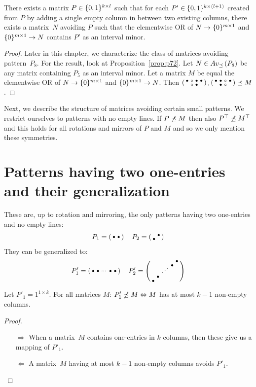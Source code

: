 \begin{prop}
There exists a matrix $P\in\{0,1\}^{k\times l}$ such that for each $P'\in\{0,1\}^{k\times(l+1)}$ created from $P$ by adding a single empty column in between two existing columns, there exists a matrix~$N$ avoiding $P$ such that the elementwise OR of $N\rightarrow\{0\}^{m\times 1}$ and $\{0\}^{m\times 1}\rightarrow N$ contains $P'$ as an interval minor.
\end{prop}
\begin{proof}
Later in this chapter, we characterize the class of matrices avoiding pattern~$P_8$. For the result, look at Proposition~\ref{prop:p72}. Let $N\in Av_{\preceq}\left(P_8\right)$ be any matrix containing $P_5$ as an interval minor. Let a matrix $M$ be equal the elementwise OR of $N\rightarrow\{0\}^{m\times 1}$ and $\{0\}^{m\times 1}\rightarrow N$. Then $\left(\begin{smallmatrix}\bullet&\circ&\bullet&\bullet\\ &\circ&\bullet& \end{smallmatrix}\right),\left(\begin{smallmatrix}\bullet&\bullet&\circ&\bullet\\ &\bullet&\circ& \end{smallmatrix}\right)\preceq M$.
\end{proof}

Next, we describe the structure of matrices avoiding certain small patterns. We restrict ourselves to patterns with no empty lines. If $P\not\preceq M$ then also $P^\top\not\preceq M^\top$ and this holds for all rotations and mirrors of $P$ and $M$ and so we only mention these symmetries.

\section{Patterns having two one-entries and their generalization}
\label{sec:2ones}
These are, up to rotation and mirroring, the only patterns having two one-entries and no empty lines:
$$P_1=\smm{\bullet&\bullet}\ \ 
\ P_2=\smm{ &\bullet\\\bullet& }$$
They can be generalized to:
$$P'_1=\smm{\bullet&\bullet&\cdots&\bullet&\bullet}\ \ 
\ P'_2=\smm{ & & & &\bullet\\ & & &\bullet& \\ & &\Ddots& & \\ &\bullet& & & \\\bullet& & & & }$$

\begin{prop}
Let $P'_1=1^{1\times k}$. For all matrices $M$: $P'_1\not\preceq M\Leftrightarrow M$ has at most $k-1$ non-empty columns.
\end{prop}
\begin{proof}
\begin{itemize}
	\item[$\Rightarrow$] When a matrix~$M$ contains one-entries in $k$ columns, then these give us a mapping of $P'_1$.
	\item[$\Leftarrow$] A matrix~$M$ having at most $k-1$ non-empty columns avoids $P'_1$.
\end{itemize}
\end{proof}

